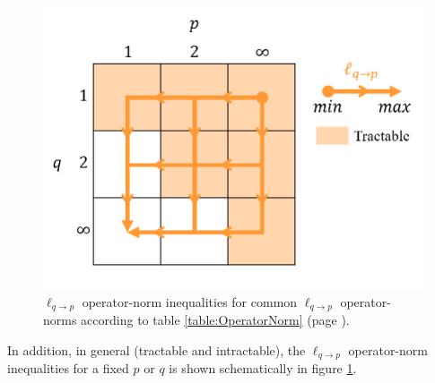 \begin{figure}[!b]
\centering
\includegraphics[width=.4\textwidth,keepaspectratio]{images/OperatorNorm-Inequalities.png} 
\centering
\caption{$\ell_{q {\to} p}$ operator-norm inequalities for common $\ell_{q {\to} p}$ operator-norms according to table \ref{table:OperatorNorm} (page \pageref{table:OperatorNorm}).}
\label{fig:OperatorNorm-Inequalities}
\end{figure}
In addition, in general (tractable and intractable), the $\ell_{q {\to} p}$ operator-norm inequalities for a fixed $p$ or $q$ is shown schematically in figure \ref{fig:OperatorNorm-Inequalities}.